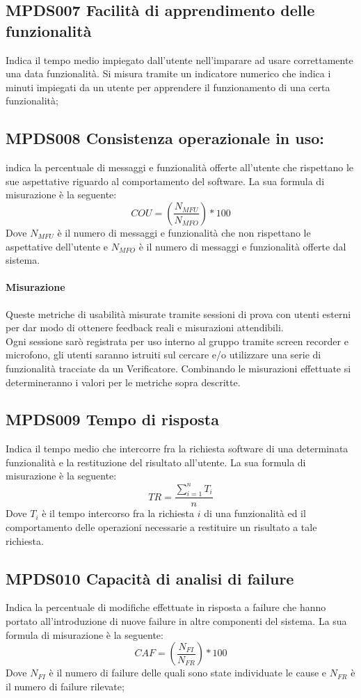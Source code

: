 \documentclass[NormeDiProgetto.tex]{subfiles}
\begin{document}
\subsection{MPDS007 Facilità di apprendimento delle funzionalità} Indica il tempo medio impiegato dall'utente nell'imparare ad usare correttamente una data funzionalità. Si misura tramite un indicatore numerico che indica i minuti impiegati da un utente per apprendere il funzionamento di una certa funzionalità;
\subsection{MPDS008 Consistenza operazionale in uso:} indica la percentuale di messaggi e funzionalità offerte all'utente che rispettano le sue aspettative riguardo al comportamento del software. La sua formula di misurazione è la seguente: \[COU=(\frac{N_{MFU}}{N_{MFO}})*100\] Dove $ N_{MFU} $ è il numero di messaggi e funzionalità che non rispettano le aspettative dell'utente e $ N_{MFO} $ è il numero di messaggi e funzionalità offerte dal sistema.	

\paragraph{Misurazione}
Queste metriche di usabilità misurate tramite sessioni di prova con utenti esterni per dar modo di ottenere feedback reali e misurazioni attendibili.\\ Ogni sessione sarò registrata per uso interno al gruppo tramite screen recorder e microfono, gli utenti saranno istruiti sul cercare e/o utilizzare una serie di funzionalità tracciate da un Verificatore.
Combinando le misurazioni effettuate si determineranno i valori per le metriche sopra descritte.


\subsection{MPDS009 Tempo di risposta} Indica il tempo medio che intercorre fra la richiesta software di una determinata funzionalità e la restituzione del risultato all'utente. La sua formula di misurazione è la seguente: \[TR=\frac{\sum_{i=1}^n T_i}{n}\] Dove $ T_i $ è il tempo intercorso fra la richiesta $ i $ di una funzionalità ed il comportamento delle operazioni necessarie a restituire un risultato a tale richiesta.	

\subsection{MPDS010 Capacità di analisi di failure} Indica la percentuale di modifiche effettuate in risposta a failure che hanno portato all'introduzione di nuove failure in altre componenti del sistema. La sua formula di misurazione è la seguente: \[CAF=(\frac{N_{FI}}{N_{FR}})*100\] Dove $ N_{FI} $ è il numero di failure delle quali sono state individuate le cause e $ N_{FR} $ è il numero di failure rilevate;
\end{document}
